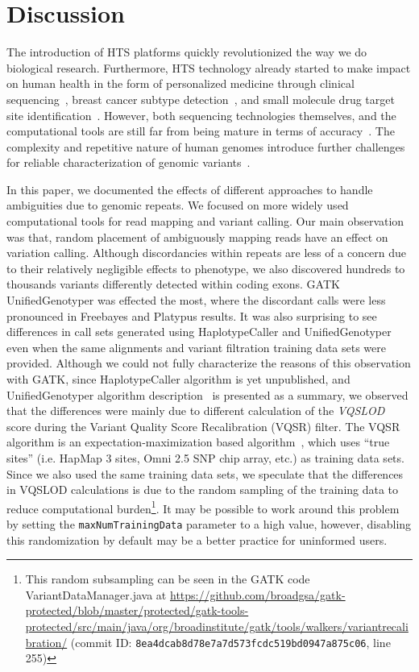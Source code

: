 \documentclass[10pt,a4paper]{article}
\begin{document}
\section*{Discussion}

The introduction of HTS platforms  quickly revolutionized the way we do biological research\cite{Mardis2008,Metzker2010}. Furthermore, HTS technology  already started to make impact on human health in the form of personalized medicine
through clinical sequencing~\cite{Biesecker2009}, breast cancer subtype detection~\cite{Bosdet2013}, and small molecule drug target site identification~\cite{Rodriguez2014}. However, both sequencing technologies themselves,%
 and the computational tools are still far from being mature in terms of accuracy~\cite{Alkan2011,Nielsen2011}. The complexity and repetitive nature of human genomes introduce further challenges for reliable characterization of genomic variants~\cite{Treangen2012}.

In this paper, we documented the effects of different approaches to handle ambiguities due to genomic repeats. We focused on more widely used computational tools for read mapping and variant calling. Our main observation was that, random placement of ambiguously mapping reads have an effect on variation calling. Although discordancies within repeats are less of a concern due to their relatively negligible 
effects to phenotype, we also discovered hundreds to thousands variants differently detected within coding exons. GATK UnifiedGenotyper was effected the most, where the discordant calls were less pronounced in Freebayes and Platypus results. It was also surprising to see differences in call sets generated using HaplotypeCaller and UnifiedGenotyper even when the same alignments and variant filtration training data sets were provided. Although we could not fully characterize the reasons
of this observation with GATK, since HaplotypeCaller algorithm is yet unpublished, and UnifiedGenotyper algorithm description~\cite{DePristo2011} is presented as a summary, we observed that the differences were
mainly due to different calculation of the {\it VQSLOD} score during the Variant Quality Score Recalibration (VQSR) filter. The VQSR algorithm is an expectation-maximization based algorithm~\cite{DePristo2011},
which uses ``true sites'' (i.e. HapMap 3 sites, Omni 2.5 SNP chip array, etc.) as training data sets. Since we also used the same training data sets, 
we speculate that the differences in VQSLOD calculations is due to the random sampling of the training data
to reduce computational burden\footnote{This random subsampling can be seen in the GATK code VariantDataManager.java at \url{https://github.com/broadgsa/gatk-protected/blob/master/protected/gatk-tools-protected/src/main/java/org/broadinstitute/gatk/tools/walkers/variantrecalibration/} (commit ID: {\tt 8ea4dcab8d78e7a7d573fcdc519bd0947a875c06}, line 255)}. It may be possible to work around this problem by setting the {\tt maxNumTrainingData} parameter to a high value, however, disabling this randomization
by default may be a better practice for uninformed users.
\end{document}
